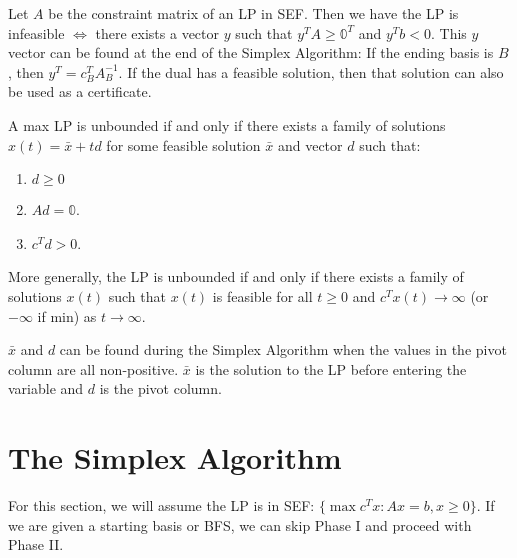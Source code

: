 \documentclass[a4paper]{report}
\begin{document}
	\begin{definition}
		\label{infeasibility} Let $A$ be the constraint matrix of an LP in SEF. Then
		we have the LP is infeasible $\Longleftrightarrow$ there exists a vector $y$
		such that $y^{T} A \geq \mathbb{0}^{T}$ and $y^{T} b < 0$. This $y$ vector can
		be found at the end of the Simplex Algorithm: If the ending basis is $B$, then
		$y^{T} = c_{B}^{T} A_{B}^{-1}$. If the dual has a feasible solution, then that
		solution can also be used as a certificate.
	\end{definition}

	\begin{definition}
		\label{unboundedness} A max LP is unbounded if and only if there exists a family
		of solutions $x(t) = \bar x + td$ for some feasible solution $\bar x$ and vector
		$d$ such that:
		\begin{enumerate}
			\item $d \geq 0$

			\item $Ad = \mathbb{0}$.

			\item $c^{T} d > 0$.
		\end{enumerate}

		More generally, the LP is unbounded if and only if there exists a family of
		solutions $x(t)$ such that $x(t)$ is feasible for all $t \geq 0$ and
		$c^{T}x(t) \rightarrow \infty$ (or $-\infty$ if min) as
		$t \rightarrow \infty$.

		$\bar x$ and $d$ can be found during the Simplex Algorithm when the values
		in the pivot column are all non-positive. $\bar x$ is the solution to the LP
		before entering the variable and $d$ is the pivot column.
	\end{definition}

	\section{The Simplex Algorithm}
	For this section, we will assume the LP is in SEF:
	$\{\max c^{T} x : Ax = b, x \geq 0\}$. If we are given a starting basis or BFS,
	we can skip Phase I and proceed with Phase II.
\end{document}
